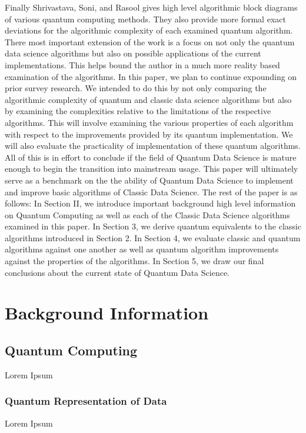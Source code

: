 \documentclass[conference]{IEEEtran}
\begin{document}
\newline
\indent Finally Shrivastava, Soni, and Rasool gives high level algorithmic block diagrams of various quantum computing methods. They also provide more formal exact deviations for the algorithmic complexity of each examined quantum algorithm. There most important extension of the work is a focus on not only the quantum data science algorithms but also on possible applications of the current implementations. This helps bound the author in a much more reality based examination of the algorithms.\cite{b8}    
\newline
\indent In this paper, we plan to continue expounding on prior survey research. We intended to do this by not only comparing the algorithmic complexity of quantum and classic data science algorithms but also by examining the complexities relative to the limitations of the respective algorithms. This will involve examining the various properties of each algorithm with respect to the improvements provided by its quantum implementation. We will also evaluate the practicality of implementation of these quantum algorithms. All of this is in effort to conclude if the field of Quantum Data Science is mature enough to begin the transition into mainstream usage. This paper will ultimately serve as a benchmark on the the ability of Quantum Data Science to implement and improve basic algorithms of Classic Data Science. The rest of the paper is as follows: In Section II, we introduce important background high level information on Quantum Computing as well as each of the Classic Data Science algorithms examined in this paper. In Section 3, we derive quantum equivalents to the classic algorithms introduced in Section 2. In Section 4, we evaluate classic and quantum algorithms against one another as well as quantum algorithm improvements against the properties of the algorithms. In Section 5, we draw our final conclusions about the current state of Quantum Data Science.    
\section{Background Information}

\subsection{Quantum Computing}
Lorem Ipsum
\subsubsection{Quantum Representation of Data}
Lorem Ipsum
\end{document}
